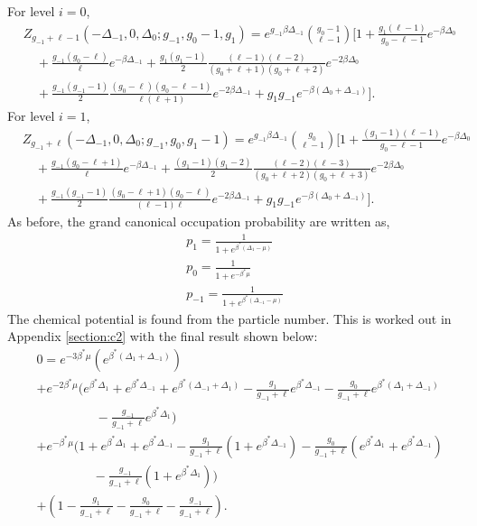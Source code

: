For level $i=0$,
\begin{align}
    &Z_{g_{-1}+\ell-1}(-\Delta_{-1},0,\Delta_0;g_{-1},g_0-1,g_1)=e^{g_{-1}\beta\Delta_{-1}} {g_0-1\choose \ell-1} \Biggr[1+\frac{g_1 (\ell-1)}{g_0-\ell-1} e^{-\beta\Delta_0}\nonumber\\
    &\quad+\frac{g_{-1}(g_0-\ell)}{\ell} e^{-\beta\Delta_{-1}} +\frac{g_1(g_1-1)}{2} \frac{(\ell-1)(\ell-2)}{(g_0+\ell+1)(g_0+\ell+2)}e^{-2\beta\Delta_0}\nonumber\\ &\quad+\frac{g_{-1}(g_{-1}-1)}{2} \frac{(g_0-\ell)(g_0-\ell-1)}{\ell(\ell+1)} e^{-2\beta\Delta_{-1}} +g_1g_{-1}e^{-\beta(\Delta_0+\Delta_{-1})}\Biggr].
\end{align}
For level $i=1$,
\begin{align}
    &Z_{g_{-1}+\ell}(-\Delta_{-1},0,\Delta_0;g_{-1},g_0,g_1-1) =e^{g_{-1}\beta\Delta_{-1}} {g_0\choose \ell-1} \Biggr[1+\frac{(g_1-1) (\ell-1)}{g_0-\ell-1} e^{-\beta\Delta_0} \nonumber\\
    &\quad+\frac{g_{-1}(g_0-\ell+1)}{\ell} e^{-\beta\Delta_{-1}} +\frac{(g_1-1)(g_1-2)}{2} \frac{(\ell-2)(\ell-3)}{(g_0+\ell+2)(g_0+\ell+3)}e^{-2\beta\Delta_0}\nonumber\\ &\quad+\frac{g_{-1}(g_{-1}-1)}{2} \frac{(g_0-\ell+1)(g_0-\ell)}{(\ell-1)\ell} e^{-2\beta\Delta_{-1}} +g_1g_{-1}e^{-\beta(\Delta_0+\Delta_{-1})}\Biggr].
\end{align}
As before, the grand canonical occupation probability are written as,
\begin{gather}
    p_1=\frac{1}{1+e^{\beta^*(\Delta_1-\mu)}}\nonumber\\
    p_0=\frac{1}{1+e^{-\beta^*\mu}}\nonumber\\
    p_{-1}=\frac{1}{1+e^{\beta^*(\Delta_{-1}-\mu)}}\nonumber
\end{gather}
The chemical potential is found from the particle number. This is worked out in Appendix \ref{section:c2} with the final result shown below:
\begin{align}
    &0=e^{-3\beta^*\mu}(e^{\beta^*(\Delta_1+\Delta_{-1})})\nonumber\\
    &+e^{-2\beta^*\mu}\Biggr(e^{\beta^*\Delta_1}+e^{\beta^*\Delta_{-1}}+e^{\beta^*(\Delta_{-1}+\Delta_1)}-\frac{g_1}{g_{-1}+\ell}e^{\beta^*\Delta_{-1}}\nonumber-\frac{g_0}{g_{-1}+\ell}e^{\beta^*(\Delta_1+\Delta_{-1})}\nonumber\\
    &\quad\quad\quad\quad\ \ \ -\frac{g_{-1}}{g_{-1}+\ell}e^{\beta^*\Delta_1}\Biggr)\nonumber\\
    &+e^{-\beta^*\mu}\Biggr(1+e^{\beta^*\Delta_1}+e^{\beta^*\Delta_{-1}}-\frac{g_1}{g_{-1}+\ell}(1+e^{\beta^*\Delta_{-1}})-\frac{g_0}{g_{-1}+\ell}(e^{\beta^*\Delta_1}+e^{\beta^*\Delta_{-1}})\nonumber\\
    &\quad\quad\quad\quad\ \ -\frac{g_{-1}}{g_{-1}+\ell}(1+e^{\beta^*\Delta_1})\Biggr)\nonumber\\
    & +(1-\frac{g_1}{g_{-1}+\ell}-\frac{g_0}{g_{-1}+\ell}-\frac{g_{-1}}{g_{-1}+\ell}).
\end{align}
